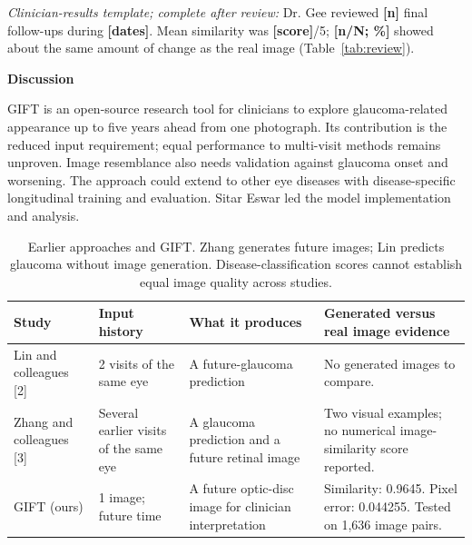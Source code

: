 \documentclass[10pt,letterpaper]{article}
\newcommand{\subhead}[1]{\par\vspace{3pt}\noindent\textbf{#1}\par\nobreak}
\newcommand{\fillin}[1]{\textcolor{forecastorange}{\textbf{[#1]}}}
\begin{document}
\textcolor{forecastorange}{\emph{Clinician-results template; complete after review:}} Dr. Gee reviewed \fillin{n} final follow-ups during \fillin{dates}. Mean similarity was \fillin{score}/5; \fillin{n/N; \%} showed about the same amount of change as the real image (Table~\ref{tab:review}).

\subhead{Discussion}
GIFT is an open-source research tool for clinicians to explore glaucoma-related appearance up to five years ahead from one photograph. Its contribution is the reduced input requirement; equal performance to multi-visit methods remains unproven. Image resemblance also needs validation against glaucoma onset and worsening. The approach could extend to other eye diseases with disease-specific longitudinal training and evaluation. Sitar Eswar led the model implementation and analysis.

\clearpage
\begin{table}[!ht]
\centering\small
\setlength{\tabcolsep}{4pt}
\begin{tabularx}{\textwidth}{@{}L{0.88in}L{1.03in}L{1.42in}>{\raggedright\arraybackslash}X@{}}
\toprule
\textbf{Study} & \textbf{Input history} & \textbf{What it produces} & \textbf{Generated versus real image evidence}\\
\midrule
Lin and colleagues [2] & 2 visits of the same eye & A future-glaucoma prediction & No generated images to compare.\\
Zhang and colleagues [3] & Several earlier visits of the same eye & A glaucoma prediction and a future retinal image & Two visual examples; no numerical image-similarity score reported.\\
GIFT (ours) & 1 image; future time & A future optic-disc image for clinician interpretation & Similarity: 0.9645. Pixel error: 0.044255. Tested on 1,636 image pairs.\\
\bottomrule
\end{tabularx}
\caption{Earlier approaches and GIFT. Zhang generates future images; Lin predicts glaucoma without image generation. Disease-classification scores cannot establish equal image quality across studies.}
\label{tab:literature}
\end{table}
\end{document}
